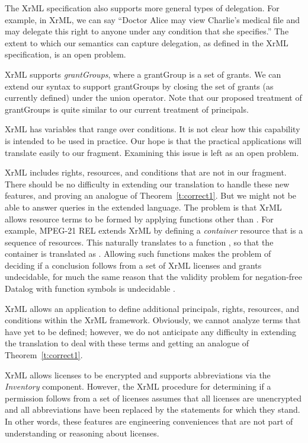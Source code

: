 \documentclass{acmtrans2m}
\newcommand{\<}{
}
\renewcommand{\>}{\rangle}
\begin{document}
\begin{itemize}
The XrML specification
also
supports more general types of delegation.  For
example, in XrML, we can
say ``Doctor Alice may view Charlie's medical file and may delegate this
right to anyone under
any condition that she specifies.''
The extent to which our semantics can capture delegation, as defined in the XrML specification,
is an open problem.
\item XrML supports \emph{grantGroups}, where a grantGroup is a set of grants.  We can extend our syntax
to support grantGroups by closing the set of grants (as currently defined) under the union operator.
Note that our proposed treatment of grantGroups is quite similar to our current treatment of principals.
\item XrML has variables that range over conditions.  It is
not clear how this capability
is intended to be used in practice.  Our hope is that the practical
applications will translate easily
to our fragment.  Examining this issue is left as an open problem.
\begin{sloppypar}
\item XrML includes rights, resources, and conditions that are not in our fragment.  There should be no
difficulty in extending our translation to handle these new features, and proving an analogue of
Theorem~\ref{t:correct1}.  But we might not be able to answer queries in the extended language.  The
problem is that XrML allows resource terms to be formed by applying functions other than .  For
example, MPEG-21 REL extends XrML by defining a \emph{container} resource that is a sequence of resources.
This naturally translates to a function , so that
the container  is translated as
.  Allowing such functions makes the problem of deciding
if a conclusion follows from a set of XrML licenses and grants undecidable, for much the same reason that
the validity problem for negation-free Datalog with function symbols is undecidable \cite{NS}.
\end{sloppypar}
\item XrML allows an application to define additional principals, rights, resources, and conditions within
the XrML framework.  Obviously, we cannot analyze terms that have yet to be defined; however, we do not
anticipate any difficulty in extending the translation to deal with these terms and getting an analogue of
Theorem~\ref{t:correct1}.
\item XrML allows licenses to be encrypted and supports abbreviations via the \emph{Inventory} component.
However, the XrML procedure for determining if a permission follows from a set of licenses assumes that all
licenses are unencrypted and all abbreviations have been replaced by the statements for which they stand.
In other words, these features are engineering conveniences that are not part of understanding or reasoning
about licenses.
\end{itemize}
\end{document}
